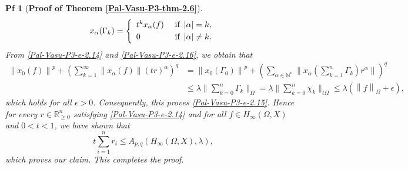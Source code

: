 \documentclass[10pt,a4paper]{amsart}
\newtheorem{pf}{Pf}
\newcommand{\norm}[1]{\left\lVert#1\right\rVert}
\begin{document}
\begin{pf} [{\bf Proof of Theorem \ref{Pal-Vasu-P3-thm-2.6}}]
\begin{equation*}
		x_{\alpha}(\Gamma_{k})=
		\left\{\begin{array}{ll}
			t^kx_{\alpha}(f) & \mbox{ if  \,$|\alpha|=k$},\\[1mm]
			0  & \mbox{ if \,$|\alpha|\neq k$}.
		\end{array}\right.
	\end{equation*}
	From \eqref{Pal-Vasu-P3-e-2.14} and \eqref{Pal-Vasu-P3-e-2.16}, we obtain that
	\begin{align*}
		\norm{x_0(f)}^p+\left(\sum_{k=1}^{\infty}\norm{x_{\alpha}(f)}(tr)^{\alpha}\right)^q &= \norm{x_0(\Gamma_{0})}^p + \left(\sum_{\alpha\in \mathbb{N}^n}\bigg\|x_{\alpha}\left(\sum_{k=1}^{n}\Gamma_{k}\right)r^{\alpha}\bigg\|\right)^q\\[2mm] & \leq \lambda \bigg\|\sum_{k=0}^{n}\Gamma_{k}\bigg\|_{\Omega}=\lambda \bigg\|\sum_{k=0}^{n}\chi_{k}\bigg\|_{t\Omega}\leq \lambda \left(\norm{f}_{\Omega}+\epsilon\right),
	\end{align*} 
	which holds for all $\epsilon>0$. Consequently, this proves \eqref{Pal-Vasu-P3-e-2.15}.
	Hence for every $r\in \mathbb{R}^n_{\geq 0}$ satisfying \eqref{Pal-Vasu-P3-e-2.14} and for all $f\in H_{\infty}(\Omega, X)$ and $0<t<1$, we have shown that 
	\begin{equation*}
		t\sum_{i=1}^{n}r_i \leq A_{p,q}(H_{\infty}(\Omega,X),\lambda),
	\end{equation*}
	which proves our claim. This completes the proof.
\end{pf}
\end{document}
